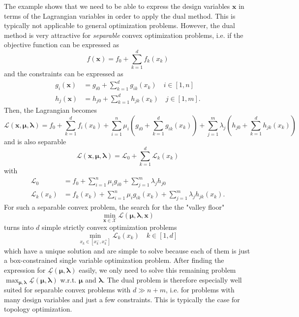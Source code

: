 The example shows that we need to be able to express the design variables $\mathbf{x}$ in terms of the Lagrangian variables in order to apply the dual method. This is typically not applicable to general optimization problems. However, the dual method is very attractive for \emph{separable} convex optimization problems, i.e. if the objective function can be expressed as 
\begin{equation}
    f(\mathbf{x}) = f_0 + \sum_{k=1}^d f_k(x_k)
\end{equation}
and the constraints can be expressed as 
\begin{align}
    g_i(\mathbf{x}) & = g_{i0} + \sum_{k=1}^d g_{ik}(x_k) \quad i \in [1,n]\\
    h_j(\mathbf{x}) & = h_{j0} + \sum_{k=1}^d h_{jk}(x_k) \quad j \in [1,m].
\end{align}
Then, the Lagrangian becomes 
\begin{equation}
    \mathcal{L} (\mathbf{x}, \pmb{\mu}, \pmb{\lambda}) = f_0 + \sum_{k=1}^d f_i(x_k) + \sum_{i=1}^n \mu_i \left(g_{i0} + \sum_{k=1}^d g_{ik}(x_k) \right) + \sum_{j=1}^m \lambda_j  \left(h_{j0} + \sum_{k=1}^d h_{jk}(x_k) \right)
\end{equation}
and is also separable
\begin{equation}
    \mathcal{L} (\mathbf{x}, \pmb{\mu}, \pmb{\lambda}) = \mathcal{L}_0 + \sum_{k=1}^d \mathcal{L}_k(x_k)
\end{equation}
with 
\begin{align}
    \mathcal{L}_0 &= f_0 + \sum_{i=1}^n \mu_i g_{i0} + \sum_{j=1}^m \lambda_j  h_{j0} \\
    \mathcal{L}_k (x_k) & = f_k(x_k) + \sum_{i=1}^n \mu_i g_{ik}(x_k) + \sum_{j=1}^m \lambda_j  h_{jk}(x_k). 
\end{align}
For such a separable convex problem, the search for the the "valley floor" 
\begin{equation}
    \min_{\mathbf{x}\in \mathcal{X}} \mathcal{L}(\pmb{\mu}, \pmb{\lambda}, \mathbf{x})
\end{equation} 
turns into $d$ simple strictly convex optimization problems 
\begin{equation}
    \min_{x_k \in [x_k^-, x_k^+]} \mathcal{L}_k(x_k) \quad k \in[1,d]
\end{equation}
which have a unique solution and are simple to solve because each of them is just a box-constrained single variable optimization problem. 
After finding the expression for $\underline{\mathcal{L}} (\pmb{\mu}, \pmb{\lambda})$ easily, we only need to solve this remaining problem $\max_{\pmb{\mu}, \pmb{\lambda}} \underline{\mathcal{L}} (\pmb{\mu}, \pmb{\lambda})$ w.r.t. $\pmb{\mu}$ and $\pmb{\lambda}$. The dual problem is therefore especially well suited for separable convex problems with $d \gg n+m$, i.e. for problems with many design variables and just a few constraints. This is typically the case for topology optimization.

